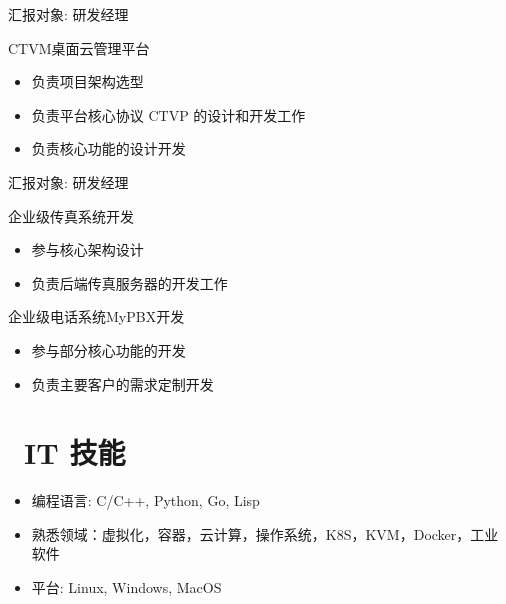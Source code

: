 \documentclass{resume}
\begin{document}
 {汇报对象: 研发经理}

\begin{onehalfspacing}
CTVM桌面云管理平台
\begin{itemize}
  \item 负责项目架构选型
  \item 负责平台核心协议 CTVP 的设计和开发工作
  \item 负责核心功能的设计开发
\end{itemize}
\end{onehalfspacing}

 {汇报对象: 研发经理}

\begin{onehalfspacing}
企业级传真系统开发
\begin{itemize}
  \item 参与核心架构设计
  \item 负责后端传真服务器的开发工作
\end{itemize}
\end{onehalfspacing}

\begin{onehalfspacing}
企业级电话系统MyPBX开发 
\begin{itemize}
  \item 参与部分核心功能的开发
  \item 负责主要客户的需求定制开发
\end{itemize}
\end{onehalfspacing}


\section{\faCogs\ IT 技能}
\begin{itemize}[parsep=0.5ex]
  \item 编程语言: C/C++, Python, Go, Lisp
  \item 熟悉领域：虚拟化，容器，云计算，操作系统，K8S，KVM，Docker，工业软件
  \item 平台: Linux, Windows, MacOS
\end{itemize}
\end{document}
